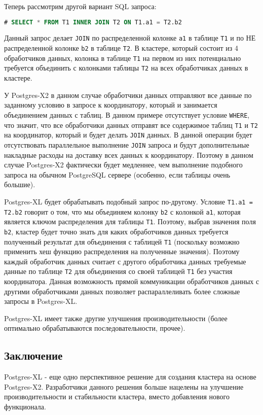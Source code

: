 Теперь рассмотрим другой вариант SQL запроса:

\begin{lstlisting}[language=SQL,label=lst:postgres-xl1,caption=Запрос на распределенные таблицы]
# SELECT * FROM T1 INNER JOIN T2 ON T1.a1 = T2.b2
\end{lstlisting}

Данный запрос делает \lstinline!JOIN! по распределенной колонке \lstinline!a1! в таблице \lstinline!T1! и по НЕ распределенной колонке \lstinline!b2! в таблице \lstinline!T2!. В кластере, который состоит из 4 обработчиков данных, колонка в таблице \lstinline!T1! на первом из них потенциально требуется объединить с колонками таблицы \lstinline!T2! на всех обработчиках данных в кластере.

У Postgres-X2 в данном случае обработчики данных отправляют все данные по заданному условию в запросе к координатору, который и занимается объединением данных с таблиц. В данном примере отсутствует условие \lstinline!WHERE!, что значит, что все обработчики данных отправят все содержимое таблиц \lstinline!T1! и \lstinline!T2! на координатор, который и будет делать \lstinline!JOIN! данных. В данной операции будет отсутствовать параллельное выполнение \lstinline!JOIN! запроса и будут дополнительные накладные расходы на доставку всех данных к координатору. Поэтому в данном случае Postgres-X2 фактически будет медленнее, чем выполнение подобного запроса на обычном PostgreSQL сервере (особенно, если таблицы очень большие).

Postgres-XL будет обрабатывать подобный запрос по-другому. Условие \lstinline!T1.a1 = T2.b2! говорит о том, что мы объединяем колонку \lstinline!b2! с колонкой \lstinline!a1!, которая является ключом распределения для таблицы \lstinline!T1!. Поэтому, выбрав значения поля \lstinline!b2!, кластер будет точно знать для каких обработчиков данных требуется полученный результат для объединения с таблицей \lstinline!T1! (поскольку возможно применить хеш функцию распределения на полученные значения). Поэтому каждый обработчик данных считает с другого обработчика данных требуемые данные по таблице \lstinline!T2! для объединения со своей таблицей \lstinline!T1! без участия координатора. Данная возможность прямой коммуникации обработчиков данных с другими обработчиками данных позволяет распараллеливать более сложные запросы в Postgres-XL.

Postgres-XL имеет также другие улучшения производительности (более оптимально обрабатываются последовательности, прочее).


\subsection{Заключение}

Postgres-XL - еще одно перспективное решение для создания кластера на основе Postgres-X2. Разработчики данного решения больше нацелены на улучшение производительности и стабильности кластера, вместо добавления нового функционала.

